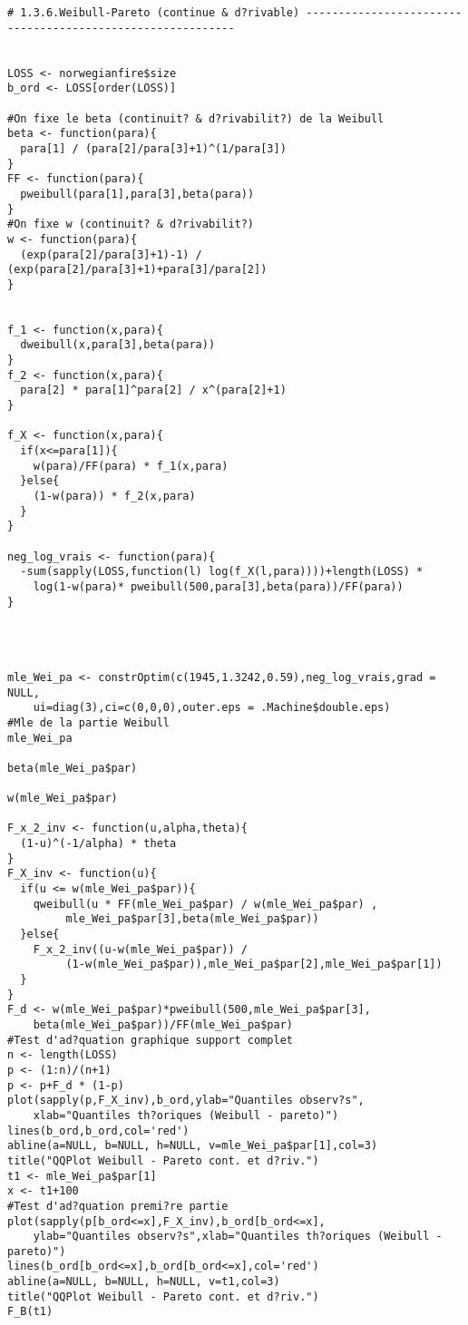 \begin{verbatim}
# 1.3.6.Weibull-Pareto (continue & d?rivable) -----------------------------------------------------------


LOSS <- norwegianfire$size
b_ord <- LOSS[order(LOSS)]

#On fixe le beta (continuit? & d?rivabilit?) de la Weibull
beta <- function(para){
  para[1] / (para[2]/para[3]+1)^(1/para[3])
}
FF <- function(para){
  pweibull(para[1],para[3],beta(para))
}
#On fixe w (continuit? & d?rivabilit?)
w <- function(para){
  (exp(para[2]/para[3]+1)-1) / (exp(para[2]/para[3]+1)+para[3]/para[2])
}


f_1 <- function(x,para){
  dweibull(x,para[3],beta(para))
}
f_2 <- function(x,para){
  para[2] * para[1]^para[2] / x^(para[2]+1)
}

f_X <- function(x,para){
  if(x<=para[1]){
    w(para)/FF(para) * f_1(x,para)
  }else{
    (1-w(para)) * f_2(x,para)
  } 
}

neg_log_vrais <- function(para){
  -sum(sapply(LOSS,function(l) log(f_X(l,para))))+length(LOSS) * 
  	log(1-w(para)* pweibull(500,para[3],beta(para))/FF(para))
}




mle_Wei_pa <- constrOptim(c(1945,1.3242,0.59),neg_log_vrais,grad = NULL,
	ui=diag(3),ci=c(0,0,0),outer.eps = .Machine$double.eps)
#Mle de la partie Weibull
mle_Wei_pa

beta(mle_Wei_pa$par)

w(mle_Wei_pa$par)

F_x_2_inv <- function(u,alpha,theta){
  (1-u)^(-1/alpha) * theta
}
F_X_inv <- function(u){
  if(u <= w(mle_Wei_pa$par)){
    qweibull(u * FF(mle_Wei_pa$par) / w(mle_Wei_pa$par) ,
    	 mle_Wei_pa$par[3],beta(mle_Wei_pa$par))
  }else{
    F_x_2_inv((u-w(mle_Wei_pa$par)) /
    	 (1-w(mle_Wei_pa$par)),mle_Wei_pa$par[2],mle_Wei_pa$par[1])
  }
}
F_d <- w(mle_Wei_pa$par)*pweibull(500,mle_Wei_pa$par[3],
	beta(mle_Wei_pa$par))/FF(mle_Wei_pa$par)
#Test d'ad?quation graphique support complet
n <- length(LOSS)
p <- (1:n)/(n+1)
p <- p+F_d * (1-p)
plot(sapply(p,F_X_inv),b_ord,ylab="Quantiles observ?s",
	xlab="Quantiles th?oriques (Weibull - pareto)")
lines(b_ord,b_ord,col='red')
abline(a=NULL, b=NULL, h=NULL, v=mle_Wei_pa$par[1],col=3)
title("QQPlot Weibull - Pareto cont. et d?riv.")
t1 <- mle_Wei_pa$par[1]
x <- t1+100
#Test d'ad?quation premi?re partie
plot(sapply(p[b_ord<=x],F_X_inv),b_ord[b_ord<=x],
	ylab="Quantiles observ?s",xlab="Quantiles th?oriques (Weibull - pareto)")
lines(b_ord[b_ord<=x],b_ord[b_ord<=x],col='red')
abline(a=NULL, b=NULL, h=NULL, v=t1,col=3)
title("QQPlot Weibull - Pareto cont. et d?riv.")
F_B(t1)



\end{verbatim}
